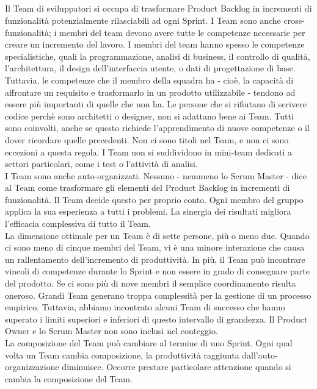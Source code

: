 \subsection*{\color{Blue}{IL TEAM}}
\label{sec:team}
Il Team di sviluppatori si occupa di trasformare Product Backlog in incrementi di funzionalit\`a potenzialmente rilasciabili ad ogni Sprint. I Team sono anche cross-funzionalit\`a; i membri del team devono avere tutte le competenze necessarie per creare un incremento del lavoro. I membri del team hanno spesso le competenze specialistiche, quali la programmazione, analisi di business, il controllo di qualit\`a, l'architettura, il design dell'interfaccia utente, o dati di progettazione di base. Tuttavia, le competenze che il membro della squadra ha - cio\`e, la capacit\`a di affrontare un requisito e trasformarlo in un prodotto utilizzabile - tendono ad essere pi\`u importanti di quelle che non ha. Le persone che si rifiutano di scrivere codice perch\`e sono architetti o designer, non si adattano bene ai Team. Tutti sono coinvolti, anche se questo richiede l'apprendimento di nuove competenze o il dover ricordare quelle precedenti. Non ci sono titoli nel Team, e non ci sono eccezioni a questa regola. I Team non si suddividono in mini-team dedicati a settori particolari, come i test o l'attivit\`a di analisi.\\
\linebreak
I Team sono anche auto-organizzati. Nessuno - nemmeno lo Scrum Master - dice al Team come trasformare gli elementi del Product Backlog in incrementi di funzionalit\`a. Il Team decide questo per proprio conto. Ogni membro del gruppo applica la sua esperienza a tutti i problemi. La sinergia dei risultati migliora l'efficacia complessiva di tutto il Team.\\
\linebreak
La dimensione ottimale per un Team \`e di sette persone, pi\`u o meno due. Quando ci sono meno di cinque membri del Team, vi \`e una minore interazione che causa un rallentamento dell'incremento di produttivit\`a. In pi\`u, il Team pu\`o incontrare vincoli di competenze durante lo Sprint e non essere in grado di consegnare parte del prodotto. Se ci sono pi\`u di nove membri il semplice coordinamento risulta oneroso. Grandi Team generano troppa complessit\`a per la gestione di un processo empirico. Tuttavia, abbiamo incontrato alcuni Team di successo che hanno superato i limiti superiori e inferiori di questo intervallo di grandezza. Il Product Owner e lo Scrum Master non sono inclusi nel conteggio.\\
\linebreak
La composizione del Team pu\`o cambiare al termine di uno Sprint. Ogni qual volta un Team cambia composizione, la  produttivit\`a raggiunta dall'auto-organizzazione diminuisce. Occorre prestare particolare attenzione quando si cambia la composizione del Team. 